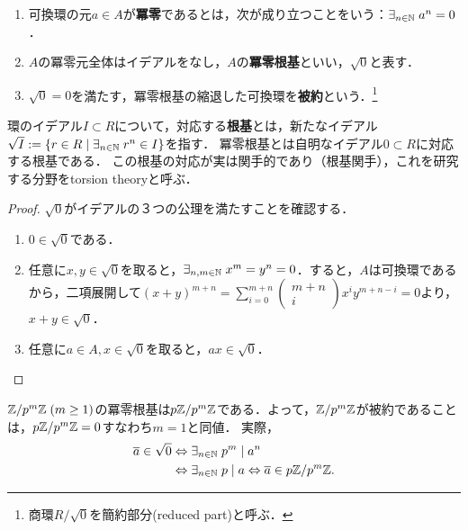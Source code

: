 \documentclass[uplatex,dvipdfmx]{jsreport}
\begin{document}
\begin{definition}\mbox{}
    \begin{enumerate}
        \item 可換環の元$a\in A$が\textbf{冪零}であるとは，次が成り立つことをいう：$\exists_{n\in\mathbb{N}}\;a^n=0$．
        \item $A$の冪零元全体はイデアルをなし，$A$の\textbf{冪零根基}といい，$\sqrt{0}$と表す．
        \item $\sqrt{0}=0$を満たす，冪零根基の縮退した可換環を\textbf{被約}という．\footnote{商環$R/\sqrt{0}$を簡約部分(reduced part)と呼ぶ．}
    \end{enumerate}
\end{definition}
\begin{remark}[radical]
    環のイデアル$I\subset R$について，対応する\textbf{根基}とは，新たなイデアル$\sqrt{I}:=\left\{r\in R\mid \exists_{n\in\mathbb{N}}\;r^n\in I\right\}$を指す．
    冪零根基とは自明なイデアル$0\subset R$に対応する根基である．
    この根基の対応が実は関手的であり（根基関手），これを研究する分野をtorsion theoryと呼ぶ．
\end{remark}
\begin{proof}
    $\sqrt{0}$がイデアルの３つの公理を満たすことを確認する．
    \begin{enumerate}
        \item $0\in\sqrt{0}$である．
        \item 任意に$x,y\in\sqrt{0}$を取ると，$\exists_{n,m\in\mathbb{N}}\;x^m=y^n=0$．すると，$A$は可換環であるから，二項展開して$(x+y)^{m+n}=\sum^{m+n}_{i=0}\begin{pmatrix}m+n\\i\end{pmatrix}x^iy^{m+n-i}=0$より，$x+y\in\sqrt{0}$．
        \item 任意に$a\in A,x\in\sqrt{0}$を取ると，$ax\in\sqrt{0}$．
    \end{enumerate}
\end{proof}

\begin{example}[有限体の冪零根基]
    $\mathbb{Z}/p^m\mathbb{Z}\;(m\ge 1)$の冪零根基は$p\mathbb{Z}/p^m\mathbb{Z}$である．よって，$\mathbb{Z}/p^m\mathbb{Z}$が被約であることは，$p\mathbb{Z}/p^m\mathbb{Z}=0$すなわち$m=1$と同値．
    実際，
    \begin{align*}
        \overline{a}\in\sqrt{0}&\Leftrightarrow\exists_{n\in\mathbb{N}}\;p^m\mid a^n\\
        &\Leftrightarrow\exists_{n\in\mathbb{N}}\;p\mid a\Leftrightarrow \overline{a}\in p\mathbb{Z}/p^m\mathbb{Z}.
    \end{align*}
\end{example}
\end{document}
